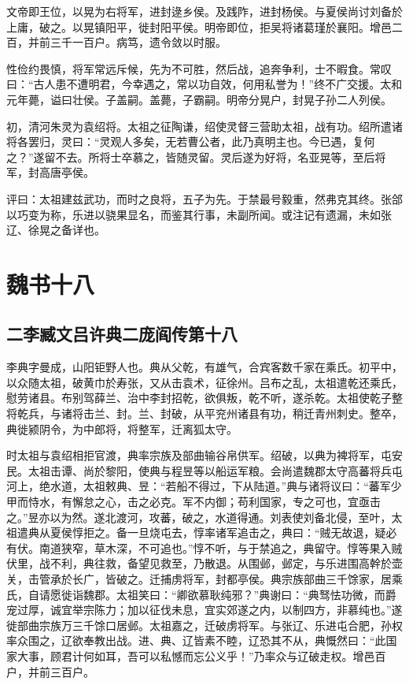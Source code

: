 \documentclass[12pt,UTF8]{ctexbook}
\begin{document}
文帝即王位，以晃为右将军，进封逯乡侯。及践阼，进封杨侯。与夏侯尚讨刘备於上庸，破之。以晃镇阳平，徙封阳平侯。明帝即位，拒吴将诸葛瑾於襄阳。增邑二百，并前三千一百户。病笃，遗令敛以时服。

性俭约畏慎，将军常远斥候，先为不可胜，然后战，追奔争利，士不暇食。常叹曰：“古人患不遭明君，今幸遇之，常以功自效，何用私誉为！”终不广交援。太和元年薨，谥曰壮侯。子盖嗣。盖薨，子霸嗣。明帝分晃户，封晃子孙二人列侯。

初，清河朱灵为袁绍将。太祖之征陶谦，绍使灵督三营助太祖，战有功。绍所遣诸将各罢归，灵曰：“灵观人多矣，无若曹公者，此乃真明主也。今已遇，复何之？”遂留不去。所将士卒慕之，皆随灵留。灵后遂为好将，名亚晃等，至后将军，封高唐亭侯。

评曰：太祖建兹武功，而时之良将，五子为先。于禁最号毅重，然弗克其终。张郃以巧变为称，乐进以骁果显名，而鉴其行事，未副所闻。或注记有遗漏，未如张辽、徐晃之备详也。

\part{魏书十八}

\chapter{二李臧文吕许典二庞阎传第十八}

李典字曼成，山阳钜野人也。典从父乾，有雄气，合宾客数千家在乘氏。初平中，以众随太祖，破黄巾於寿张，又从击袁术，征徐州。吕布之乱，太祖遣乾还乘氏，慰劳诸县。布别驾薛兰、治中李封招乾，欲俱叛，乾不听，遂杀乾。太祖使乾子整将乾兵，与诸将击兰、封。兰、封破，从平兖州诸县有功，稍迁青州刺史。整卒，典徙颍阴令，为中郎将，将整军，迁离狐太守。

时太祖与袁绍相拒官渡，典率宗族及部曲输谷帛供军。绍破，以典为裨将军，屯安民。太祖击谭、尚於黎阳，使典与程昱等以船运军粮。会尚遣魏郡太守高蕃将兵屯河上，绝水道，太祖敕典、昱：“若船不得过，下从陆道。”典与诸将议曰：“蕃军少甲而恃水，有懈怠之心，击之必克。军不内御；苟利国家，专之可也，宜亟击之。”昱亦以为然。遂北渡河，攻蕃，破之，水道得通。刘表使刘备北侵，至叶，太祖遣典从夏侯惇拒之。备一旦烧屯去，惇率诸军追击之，典曰：“贼无故退，疑必有伏。南道狭窄，草木深，不可追也。”惇不听，与于禁追之，典留守。惇等果入贼伏里，战不利，典往救，备望见救至，乃散退。从围邺，邺定，与乐进围高幹於壶关，击管承於长广，皆破之。迁捕虏将军，封都亭侯。典宗族部曲三千馀家，居乘氏，自请愿徙诣魏郡。太祖笑曰：“卿欲慕耿纯邪？”典谢曰：“典驽怯功微，而爵宠过厚，诚宜举宗陈力；加以征伐未息，宜实郊遂之内，以制四方，非慕纯也。”遂徙部曲宗族万三千馀口居邺。太祖嘉之，迁破虏将军。与张辽、乐进屯合肥，孙权率众围之，辽欲奉教出战。进、典、辽皆素不睦，辽恐其不从，典慨然曰：“此国家大事，顾君计何如耳，吾可以私憾而忘公义乎！”乃率众与辽破走权。增邑百户，并前三百户。
\end{document}

